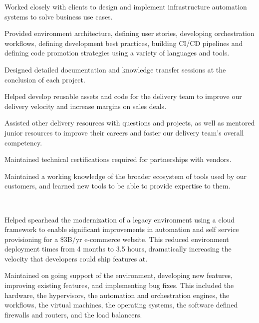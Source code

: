 \documentclass[letterpaper]{deedy-resume-openfont} %
\begin{document}
\begin{minipage}[t]{0.70\textwidth}
\begin{tightitemize}
\item Worked closely with clients to design and implement infrastructure automation systems to solve business use cases.
\item Provided environment architecture, defining user stories, developing orchestration workflows, defining development best practices, building CI/CD pipelines and defining code promotion strategies using a variety of languages and tools.
\item Designed detailed documentation and knowledge transfer sessions at the conclusion of each project.
\item Helped develop reusable assets and code for the delivery team to improve our delivery velocity and increase margins on sales deals.
\item Assisted other delivery resources with questions and projects, as well as mentored junior resources to improve their careers and foster our delivery team's overall competency.
\item Maintained technical certifications required for partnerships with vendors.
\item Maintained a working knowledge of the broader ecosystem of tools used by our customers, and learned new tools to be able to provide expertise to them.

\end{tightitemize}
\sectionspace %

\\

\begin{tightitemize}
\item Helped spearhead the modernization of a legacy environment using a cloud framework to enable significant improvements in automation and self service provisioning for a \$3B/yr e-commerce website. This reduced environment deployment times from 4 months to 3.5 hours, dramatically increasing the velocity that developers could ship features at.
\item Maintained on going support of the environment, developing new features, improving existing features, and implementing bug fixes. This included the hardware, the hypervisors, the automation and orchestration engines, the workflows, the virtual machines, the operating systems, the software defined firewalls and routers, and the load balancers.
\end{tightitemize}

\sectionspace %

\end{minipage} %
\end{document}
